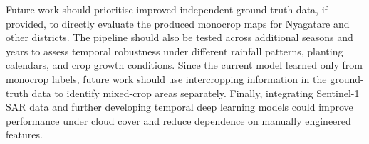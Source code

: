 Future work should prioritise improved independent ground-truth data, if
provided, to directly evaluate the produced monocrop maps for Nyagatare and
other districts. The pipeline should also be tested across additional seasons
and years to assess temporal robustness under different rainfall patterns,
planting calendars, and crop growth conditions. Since the current model learned
only from monocrop labels, future work should use intercropping information in
the ground-truth data to identify mixed-crop areas separately. Finally,
integrating Sentinel-1 SAR data and further developing temporal deep learning
models could improve performance under cloud cover and reduce dependence on
manually engineered features.